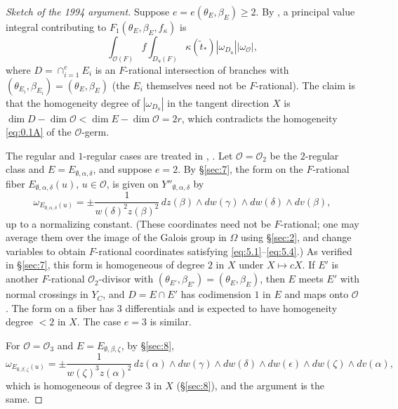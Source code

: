 \documentclass[12pt,letterpaper]{amsart}
\theoremstyle{plain}
\theoremstyle{definition}
\theoremstyle{remark}
\theoremstyle{definition}
\newcommand{\ooo}{\mathcal{O}}
\begin{document}
\begin{proof}[Sketch of the 1994 argument]
Suppose $e=e(\theta_E,\beta_E)\geq 2$. By \cite{La83}, a
principal value integral contributing to
$F_1(\theta_E,\beta_E,f_\kappa)$ is
\[
\int_{\ooo(F)}f\int_{D_u(F)}\kappa(\tilde{t}_*)
|\omega_{D_u}||\omega_{\ooo}|,
\]
where $D=\cap_{i=1}^{e}E_i$ is an
$F$-rational intersection of branches with $(\theta_{E_i},\beta_{E_i})
=(\theta_E,\beta_E)$ (the $E_i$ themselves need not be
$F$-rational). The claim is that the homogeneity degree of $|\omega_{D_u}|$
in the tangent direction $X$ is $\dim D-\dim\ooo<\dim E-\dim\ooo=2r$, which
contradicts the homogeneity \eqref{eq:0.1A} of the $\ooo$-germ.

The regular and $1$-regular cases are treated in \cite{Ha92a},
\cite{LS90}. Let ${\mathcal O}={\mathcal O}_2$ be the $2$-regular class
and $E=E_{\emptyset, \alpha,\delta}$, and suppose $e=2$.
By \S\ref{sec:7}, the form on the $F$-rational fiber
$E_{\emptyset,\alpha,\delta}(u)$, $u\in {\mathcal O}$, is given
on $Y''_{\emptyset,\alpha,\delta}$ by
\begin{equation}\tag{5.15}\label{eq:5.15}
\omega_{E_{\emptyset,\alpha,\delta}(u)}
=\pm\frac{1}{w(\delta)^2z(\beta)^2}\,dz(\beta)\wedge dw(\gamma)\wedge dw(\delta)\wedge dv(\beta),
\end{equation}
up to a normalizing constant. (These coordinates need not be
$F$-rational; one may average them over the image of the Galois group in
$\Omega$ using \S\ref{sec:2}, and change variables to obtain $F$-rational
coordinates satisfying \eqref{eq:5.1}--\eqref{eq:5.4}.)
As verified in \S\ref{sec:7}, this form is homogeneous
of degree $2$ in $X$ under $X\mapsto cX$. If $E'$ is another
$F$-rational ${\mathcal O}_2$-divisor with
$(\theta_{E'},\beta_{E'})=(\theta_E,\beta_E)$, then
$E$ meets $E'$ with normal crossings in $Y_C$, and
$D=E\cap E'$ has codimension $1$ in $E$ and maps onto ${\mathcal O}$
\cite[Ch.~II, Prop.~3.1]{DG80}. The form on a fiber has $3$ differentials and is
expected to have homogeneity degree $<2$ in $X$. The case $e=3$ is similar.

For ${\mathcal O}={\mathcal O}_3$ and $E=E_{\emptyset, \beta,\zeta}$, by
\S\ref{sec:8},
\begin{equation}\tag{5.16}\label{eq:5.16}
\omega_{E_{\emptyset,\beta,\zeta}(u)}
=\pm\frac{1}{w(\zeta)^3z(\alpha)^2}\,dz(\alpha)\wedge dw(\gamma)\wedge dw(\delta)\wedge dw(\epsilon)\wedge dw(\zeta)\wedge dv(\alpha),
\end{equation}
which is homogeneous of degree $3$ in $X$ (\S\ref{sec:8}), and the argument is the
same.
\end{proof}
\end{document}
